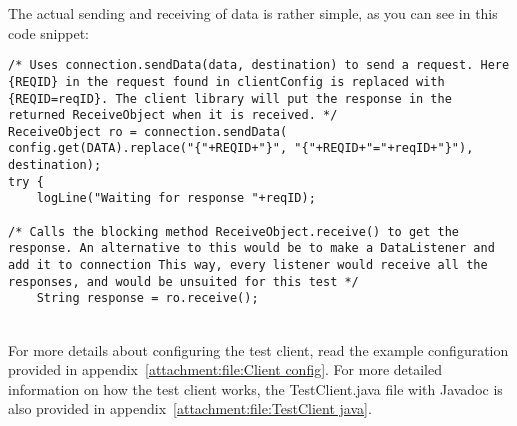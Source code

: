     The actual sending and receiving of data is rather simple, as you can see in this code snippet:
    \lstset{language=Java, style=eclipse}
    \lstset{frame=single}
    \lstset{breaklines=true}
    \lstset{showstringspaces=false}
    \begin{lstlisting}
/* Uses connection.sendData(data, destination) to send a request. Here {REQID} in the request found in clientConfig is replaced with {REQID=reqID}. The client library will put the response in the returned ReceiveObject when it is received. */
ReceiveObject ro = connection.sendData(
config.get(DATA).replace("{"+REQID+"}", "{"+REQID+"="+reqID+"}"), destination);
try {
    logLine("Waiting for response "+reqID);

/* Calls the blocking method ReceiveObject.receive() to get the response. An alternative to this would be to make a DataListener and add it to connection This way, every listener would receive all the responses, and would be unsuited for this test */
    String response = ro.receive();
    \end{lstlisting}
    \\
    For more details about configuring the test client, read the example configuration provided in appendix~\ref{attachment:file:Client config}. For more detailed information on how the test client works, the TestClient.java file with Javadoc is also provided in appendix~\ref{attachment:file:TestClient java}.

